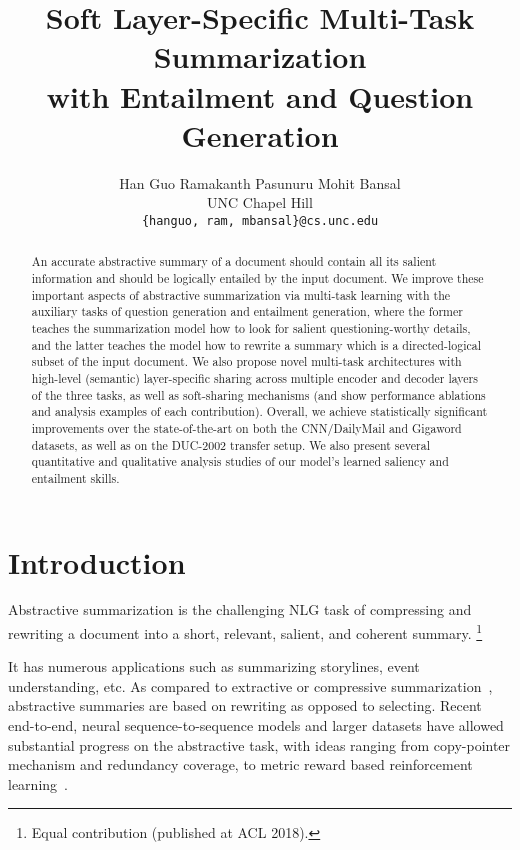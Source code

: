\documentclass[11pt,a4paper]{article}
\title{Soft Layer-Specific Multi-Task Summarization \\ with Entailment and Question Generation}
\author{Han Guo \;\;\;\;\;\;\; Ramakanth Pasunuru \;\;\;\;\;\;\; Mohit Bansal \\
  UNC Chapel Hill \\
  {\tt \{hanguo, ram, mbansal\}@cs.unc.edu} \\
 }
\date{}
\newcommand\blfootnote[1]{\begingroup
  \renewcommand\thefootnote{}\footnote{#1}\addtocounter{footnote}{-1}\endgroup
}
\begin{document}
\maketitle


\begin{abstract}
An accurate abstractive summary of a document should contain all its salient information and should be logically entailed by the input document. We improve these important aspects of abstractive summarization via multi-task learning with the auxiliary tasks of question generation and entailment generation, where the former teaches the summarization model how to look for salient questioning-worthy details, and the latter teaches the model how to rewrite a summary which is a directed-logical subset of the input document. We also propose novel multi-task architectures with high-level (semantic) layer-specific sharing across multiple encoder and decoder layers of the three tasks, as well as soft-sharing mechanisms (and show performance ablations and analysis examples of each contribution). Overall, we achieve statistically significant improvements over the state-of-the-art on both the CNN/DailyMail and Gigaword datasets, as well as on the DUC-2002 transfer setup. We also present several quantitative and qualitative analysis studies of our model's learned saliency and entailment skills. 

\end{abstract}

\section{Introduction}
\label{sec-intro}


Abstractive summarization is the challenging NLG task of compressing and rewriting a document into a short, relevant, salient, and coherent summary.\blfootnote{ Equal contribution (published at ACL 2018).}
It has numerous applications such as summarizing storylines, event understanding, etc. As compared to extractive or compressive summarization~\cite{jing2000sentence,knight2002summarization,clarke2008global,filippova2015sentence,henss2015reinforcement}, abstractive summaries are based on rewriting as opposed to selecting. Recent end-to-end, neural sequence-to-sequence models and larger datasets have allowed substantial progress on the abstractive task, with ideas ranging from copy-pointer mechanism and redundancy coverage, to metric reward based reinforcement learning~\cite{rush2015neural,chopra2016abstractive,nallapati2016abstractive,see2017get}.
\end{document}
